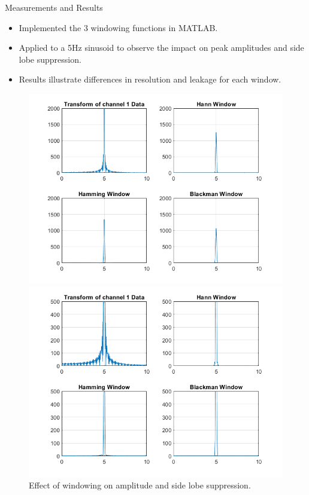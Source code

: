 \documentclass[10pt]{beamer}
\begin{document}
\begin{frame}{Measurements and Results}
  \begin{itemize}
    \item Implemented the 3 windowing functions in MATLAB.
    \item Applied to a 5Hz sinusoid to observe the impact on peak amplitudes and side lobe suppression.
    \item Results illustrate differences in resolution and leakage for each window.
  \end{itemize}
  \begin{figure}
    \centering
    \begin{minipage}{0.48\textwidth}
      \centering
      \includegraphics[width=0.9\linewidth]{figures/sin5_window.png}
    \end{minipage}%
    \hfill
    \begin{minipage}{0.48\textwidth}
      \centering
      \includegraphics[width=0.9\linewidth]{figures/sin5_window_zoomed.png}
    \end{minipage}
    \caption{Effect of windowing on amplitude and side lobe suppression.}
  \end{figure}
\end{frame}
\end{document}
